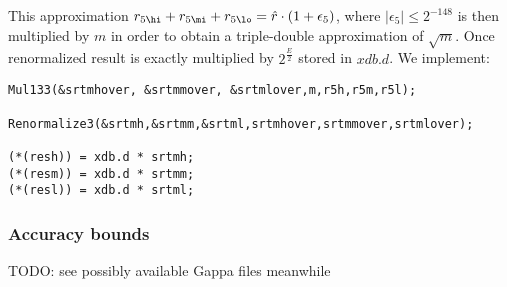 This approximation $r_{5\hi} + r_{5\mi} + r_{5\lo} = \hat{r} \cdot
\left( 1 + \epsilon_5 \right)$, where $\left \vert \epsilon_5 \right
\vert \leq 2^{-148}$ is then multiplied by $m$ in order to obtain a
triple-double approximation of $\sqrt{m}$. Once renormalized result is
exactly multiplied by $2^{\frac{E}{2}}$ stored in $xdb.d$.  We
implement:
\begin{lstlisting}[caption={Newton iteration - triple-double step},firstnumber=1]
Mul133(&srtmhover, &srtmmover, &srtmlover,m,r5h,r5m,r5l);                     
                                                                                     
Renormalize3(&srtmh,&srtmm,&srtml,srtmhover,srtmmover,srtmlover);

(*(resh)) = xdb.d * srtmh;
(*(resm)) = xdb.d * srtmm;                                                         
(*(resl)) = xdb.d * srtml;                                                         
\end{lstlisting}

\subsubsection{Accuracy bounds}

TODO: see possibly available Gappa files meanwhile


